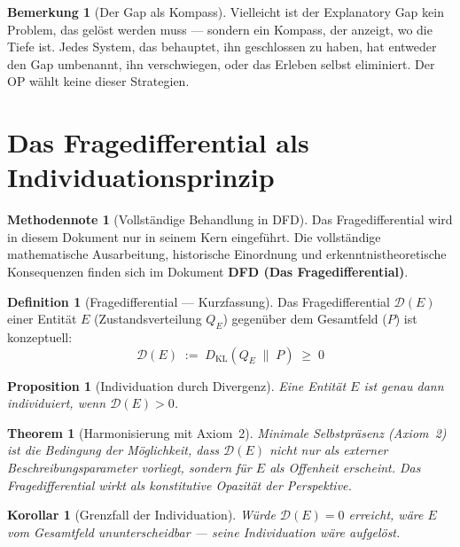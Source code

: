 \documentclass[11pt,a4paper]{article}
\theoremstyle{plain}
\newtheorem{proposition}{Proposition}[section]
\newtheorem{corollary}{Korollar}[section]
\newtheorem{theorem}{Theorem}[section]
\theoremstyle{definition}
\newtheorem{definition}{Definition}[section]
\newtheorem{remark}{Bemerkung}[section]
\newtheorem{methodennote}{Methodennote}[section]
\begin{document}
\begin{remark}[Der Gap als Kompass]
Vielleicht ist der Explanatory Gap kein Problem, das gel\"{o}st werden muss --- sondern
ein Kompass, der anzeigt, wo die Tiefe ist. Jedes System, das behauptet, ihn geschlossen
zu haben, hat entweder den Gap umbenannt, ihn verschwiegen, oder das Erleben selbst
eliminiert. Der OP w\"{a}hlt keine dieser Strategien.
\end{remark}

\section{Das Fragedifferential als Individuationsprinzip}

\begin{methodennote}[Vollst\"{a}ndige Behandlung in DFD]
Das Fragedifferential wird in diesem Dokument nur in seinem Kern eingeführt. Die
vollst\"{a}ndige mathematische Ausarbeitung, historische Einordnung und erkenntnistheoretische
Konsequenzen finden sich im Dokument \textbf{DFD (Das Fragedifferential)}.
\end{methodennote}

\begin{definition}[Fragedifferential --- Kurzfassung]
Das Fragedifferential $\mathcal{D}(E)$ einer Entit\"{a}t $E$ (Zustandsverteilung $Q_E$)
gegen\"{u}ber dem Gesamtfeld ($P$) ist konzeptuell:
\[
  \mathcal{D}(E) \;:=\; D_{\mathrm{KL}}(Q_E \;\|\; P) \;\ge\; 0
\]
\end{definition}

\begin{proposition}[Individuation durch Divergenz]
Eine Entit\"{a}t $E$ ist genau dann individuiert, wenn $\mathcal{D}(E) > 0$.
\end{proposition}

\begin{theorem}[Harmonisierung mit Axiom~2]
Minimale Selbstpr\"{a}senz (Axiom~2) ist die Bedingung der M\"{o}glichkeit, dass
$\mathcal{D}(E)$ nicht nur als externer Beschreibungsparameter vorliegt, sondern
\emph{f\"{u}r} $E$ als Offenheit erscheint. Das Fragedifferential wirkt als
\emph{konstitutive Opazit\"{a}t} der Perspektive.
\end{theorem}

\begin{corollary}[Grenzfall der Individuation]
W\"{u}rde $\mathcal{D}(E) = 0$ erreicht, w\"{a}re $E$ vom Gesamtfeld ununterscheidbar
--- seine Individuation w\"{a}re aufgel\"{o}st.
\end{corollary}
\end{document}
